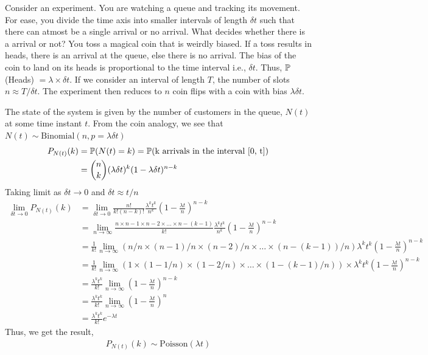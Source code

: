 \documentclass[11pt, a4paper]{report}
\begin{document}
Consider an experiment. You are watching a queue and tracking its movement. For ease, you divide the time axis into smaller intervals of length $\delta t$ such that there can atmost be a single arrival or no arrival. What decides whether there is a arrival or not? You toss a magical coin that is weirdly biased. If a toss results in heads, there is an arrival at the queue, else there is no arrival. The bias of the coin to land on its heads is proportional to the time interval i.e., $\delta t$. Thus, ${\mathbb{P}}$(Heads) $ = \lambda \times \delta t$. 
If we consider an interval of length $T$, the number of slots $n \approx T / \delta t $. The experiment then reduces to $n$ coin flips with a coin with bias $\lambda \delta t$. 

The state of the system is given by the number of customers in the queue, $N(t)$ at some time instant $t$. From the coin analogy, we see that $N(t) \sim \text{Binomial}(n, p=\lambda\delta t)$
\begin{align}
    P_{N(t)}(k) &= {\mathbb{P}}(N(t) = k) = {\mathbb{P}}(\text{k arrivals in the interval [0, t]}) \\
    &= {n \choose k} (\lambda \delta t)^{k} (1 - \lambda \delta t)^{n-k} 
\end{align} 
Taking limit as $\delta t   \rightarrow 0$ and $\delta t \approx t / n$
\begin{align}
    \lim_{\delta t \rightarrow 0} P_{N(t)}(k) &= \lim_{\delta t \rightarrow 0}\frac{n!}{k! (n-k)!} \frac{\lambda^{k} t^{k}}{n^k} (1 - \frac{\lambda t}{n})^{n-k} \\
    &= \lim_{n \rightarrow \infty}\frac{n\times n-1 \times n-2 \times \dots \times n-(k-1)}{k!} \frac{\lambda^{k} t^{k}}{n^k} (1 - \frac{\lambda t}{n})^{n-k}\\
    &= \frac{1}{k!}\lim_{n \rightarrow \infty}(n/n\times (n-1)/n \times (n-2)/n \times \dots \times (n-(k-1))/n){\lambda^{k} t^{k}} (1 - \frac{\lambda t}{n})^{n-k}\\
    &= \frac{1}{k!}\lim_{n \rightarrow \infty}(1\times (1-1/n) \times (1-2/n) \times \dots \times (1-(k-1)/n)) \times{\lambda^{k} t^{k}} (1 - \frac{\lambda t}{n})^{n-k}\\
    &= \frac{\lambda^{k} t^{k}}{k!}\lim_{n \rightarrow \infty} (1 - \frac{\lambda t}{n})^{n-k}\\ 
    &= \frac{\lambda^{k} t^{k}}{k!}\lim_{n \rightarrow \infty} (1 - \frac{\lambda t}{n})^{n} \\
    &= \frac{\lambda^{k} t^{k}}{k!} e^{-\lambda t}
\end{align}
Thus, we get the result, 
\begin{align}
    P_{N(t)}(k) \sim \text{Poisson}(\lambda t) 
\end{align}
\end{document}
